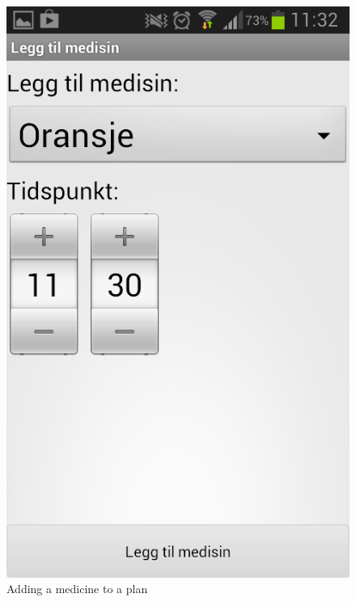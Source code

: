 \begin{figure}
\begin{minipage}[t]{0.4\linewidth}
			\includegraphics[width=0.20\paperwidth]{Pictures/new-screenshots/add-medicine-to-plan.png}
		\caption{Adding a medicine to a plan}
		\label{fig:add_medicine_to_plan}
	\end{minipage}
	\hspace{3cm}
		\begin{minipage}[t]{0.4\linewidth}
		\centering

\end{minipage}
\end{figure}
